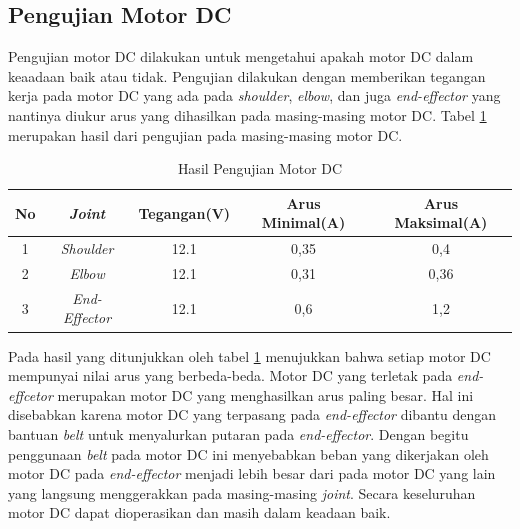 \subsection{Pengujian Motor DC}
Pengujian motor DC dilakukan untuk mengetahui apakah motor DC dalam keaadaan baik atau tidak. Pengujian dilakukan dengan memberikan tegangan kerja pada motor DC yang ada pada \textit{shoulder}, \textit{elbow}, dan juga \textit{end-effector} yang nantinya diukur arus yang dihasilkan pada masing-masing motor DC. Tabel \ref{tbl.motordc} merupakan hasil dari pengujian pada masing-masing motor DC.

\begin{table}[h]
		\centering
	\caption{Hasil Pengujian Motor DC}
	\label{tbl.motordc}
	\begin{tabular}{|c|c|c|c|c|}
		\hline
		\rowcolor[HTML]{9B9B9B} 
		No & \textit{Joint}        & Tegangan(V) & Arus Minimal(A) & Arus Maksimal(A)\\ \hline
		1  & \textit{Shoulder}     & 12.1        &   0,35       & 0,4 \\ \hline
		2  & \textit{Elbow}        & 12.1        &   0,31       & 0,36\\ \hline
		3  & \textit{End-Effector} & 12.1        &   0,6      & 1,2\\ \hline
	\end{tabular}
\end{table}

Pada hasil yang ditunjukkan oleh tabel \ref{tbl.motordc} menujukkan bahwa setiap motor DC mempunyai nilai arus yang berbeda-beda. Motor DC yang terletak pada \textit{end-effcetor} merupakan motor DC yang menghasilkan arus paling besar. Hal ini disebabkan karena motor DC yang terpasang pada \textit{end-effector} dibantu dengan bantuan \textit{belt} untuk menyalurkan putaran pada\textit{ end-effector}. Dengan begitu penggunaan \textit{belt} pada motor DC ini menyebabkan beban yang dikerjakan oleh motor DC pada \textit{end-effector} menjadi lebih besar dari pada motor DC yang lain yang langsung menggerakkan pada masing-masing \textit{joint}. Secara keseluruhan motor DC dapat dioperasikan dan masih dalam keadaan baik.

